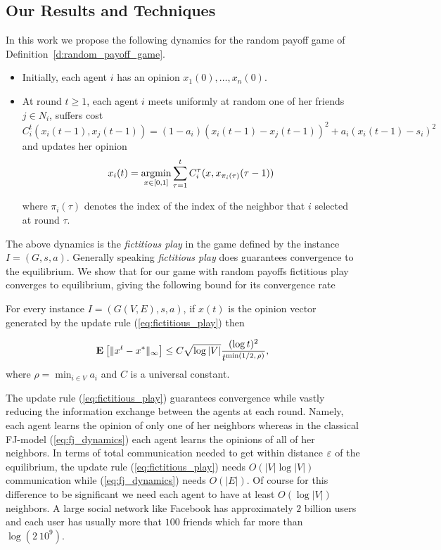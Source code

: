 \subsection{Our Results and Techniques}
In this work we propose the following dynamics for the
random payoff game of Definition~\ref{d:random_payoff_game}.

\begin{itemize}
  \item Initially, each agent $i$ has an opinion $x_1(0),\ldots,x_n(0)$.

  \item At round $t \geq 1$, each agent $i$ meets uniformly at random one of
    her friends $j \in N_i$, suffers cost
    \(
      C^t_i(x_i(t-1),x_{j}(t-1))=(1-a_i)(x_i(t-1)
      -x_j(t-1))^2 + a_i(x_i(t-1)-s_i)^2
    \)
    and updates her opinion
    \begin{equation}\label{eq:fictitious_play}
      x_i(t) =
      \operatorname*{argmin}_{x \in [0,1]}
      \sum_{\tau=1}^tC^{\tau}_i(x,x_{\pi_i(\tau)}(\tau-1))
    \end{equation}

    where $\pi_i(\tau)$ denotes the index of the index of the neighbor that $i$
    selected at round $\tau$.

\end{itemize}
The above dynamics is the \emph{fictitious play} in the game defined
by the instance $I=(G,s,a)$. Generally speaking \emph{fictitious play} does
guarantees convergence to the equilibrium.  We show that for our game with
random payoffs fictitious play converges to equilibrium, giving the following
bound for its convergence rate
\begin{theorem}
  For every instance $I=(G(V,E),s,a)$, if $x(t)$ is the opinion vector
  generated by the update rule  (\ref{eq:fictitious_play}) then

  \[
    \bm{\mathrm{E}}_{} \left[ \| x^t - x^* \|_{\infty} \right] \leq
      C \sqrt{\log |V|}\frac{(\log t)^{2}}{t^{\min(1/2,\, \rho)}},
  \]
  where $\rho = \min_{i \in V} a_i$ and $C$ is a universal constant.
\end{theorem}
The update rule (\ref{eq:fictitious_play}) guarantees convergence
while vastly reducing the information exchange between the agents
at each round.
Namely, each agent learns the opinion of only one of her neighbors
whereas in the classical FJ-model (\ref{eq:fj_dynamics}) each agent
learns the opinions of all of her neighbors. In terms of
total communication needed to get within distance $\varepsilon$ of the
equilibrium, the update rule (\ref{eq:fictitious_play}) needs
$O(|V| \log |V|)$ communication while (\ref{eq:fj_dynamics}) needs
$O(|E|)$. Of course for this difference to be significant we need
each agent to have at least $O(\log |V|)$ neighbors.  A large social
network like Facebook has approximately $2$ billion users and each user
has usually more that $100$ friends which far more than $\log(2\ 10^9)$.

